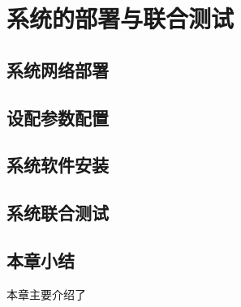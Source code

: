 
\chapter{系统的部署与联合测试}
\section{系统网络部署}

\section{设配参数配置}

\section{系统软件安装}

\section{系统联合测试}

\section{本章小结}
本章主要介绍了